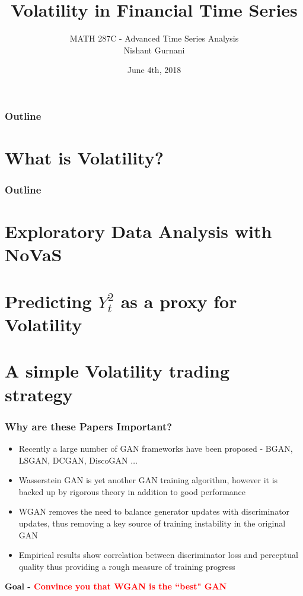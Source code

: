 \documentclass{beamer}
\title[]{Volatility in Financial Time Series}
\author{MATH 287C - Advanced Time Series Analysis \\ Nishant Gurnani}
\date{June 4th, 2018}
\begin{document}
\begin{frame}
\titlepage
\end{frame}


\begin{frame}
\frametitle{Outline}
\tableofcontents
\end{frame}

\section{What is Volatility?}
\begin{frame}
\frametitle{Outline}
\tableofcontents[currentsection]
\end{frame}

\section{Exploratory Data Analysis with NoVaS}
\section{Predicting $Y_{t}^2$ as a proxy for Volatility}
\section{A simple Volatility trading strategy}





\begin{frame}
\frametitle{Why are these Papers Important?}
\begin{itemize}

\pause
\vspace{-20pt}
\item{Recently a large number of GAN frameworks have been proposed - BGAN, LSGAN, DCGAN, DiscoGAN $\dots$}
\pause
\item{Wasserstein GAN is yet another GAN training algorithm, however it is backed up by rigorous theory in addition to good performance}
\pause
\item{WGAN removes the need to balance generator updates with discriminator updates, thus removing a key source of training instability in the original GAN}
\pause
\item{Empirical results show correlation between discriminator loss and perceptual quality thus providing a rough measure of training progress}
\end{itemize}
\pause
\vspace{10pt}
\textbf{Goal - \textcolor{red} {Convince you that WGAN is the ``best" GAN}}
\end{frame}
\end{document}
